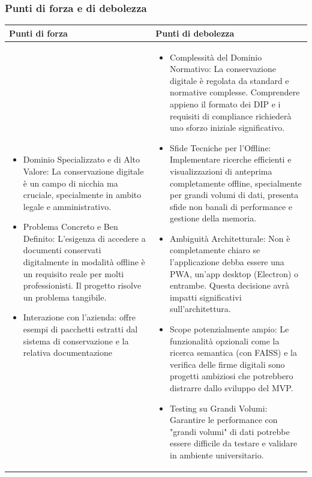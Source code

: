 \documentclass[a4paper,11pt]{article}
\begin{document}
\subsubsection{Punti di forza e di debolezza}
{\footnotesize
\begin{tabularx}{\textwidth}{|X|X|}
\hline
\rowcolor{lightgray!40} %
\textbf{Punti di forza} & \textbf{Punti di debolezza} \\
\hline
\begin{itemize}
\item Dominio Specializzato e di Alto Valore: La conservazione digitale è un campo di nicchia ma cruciale, specialmente in ambito legale e amministrativo.
\item Problema Concreto e Ben Definito: L'esigenza di accedere a documenti conservati digitalmente in modalità offline è un requisito reale per molti professionisti. Il progetto risolve un problema tangibile.
\item Interazione con l'azienda: offre esempi di pacchetti estratti dal sistema di conservazione e la relativa documentazione
\end{itemize}
 & \begin{itemize}
\item Complessità del Dominio Normativo: La conservazione digitale è regolata da standard e normative complesse. Comprendere appieno il formato dei DIP e i requisiti di compliance richiederà uno sforzo iniziale significativo.
\item Sfide Tecniche per l'Offline: Implementare ricerche efficienti e visualizzazioni di anteprima completamente offline, specialmente per grandi volumi di dati, presenta sfide non banali di performance e gestione della memoria.

\item Ambiguità Architetturale: Non è completamente chiaro se l'applicazione debba essere una PWA, un'app desktop (Electron) o entrambe. Questa decisione avrà impatti significativi sull'architettura.
\item Scope potenzialmente ampio: Le funzionalità opzionali come la ricerca semantica (con FAISS) e la verifica delle firme digitali sono progetti ambiziosi che potrebbero distrarre dallo sviluppo del MVP.
\item Testing su Grandi Volumi: Garantire le performance con "grandi volumi" di dati potrebbe essere difficile da testare e validare in ambiente universitario.
\end{itemize} \\
\hline
\end{tabularx}
}
\end{document}

